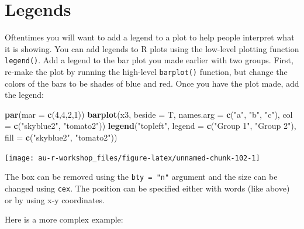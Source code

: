 \documentclass[]{book}
\newenvironment{Shaded}{\begin{snugshade}}{\end{snugshade}}
\newcommand{\DataTypeTok}[1]{\textcolor[rgb]{0.13,0.29,0.53}{#1}}
\newcommand{\DecValTok}[1]{\textcolor[rgb]{0.00,0.00,0.81}{#1}}
\newcommand{\KeywordTok}[1]{\textcolor[rgb]{0.13,0.29,0.53}{\textbf{#1}}}
\newcommand{\NormalTok}[1]{#1}
\newcommand{\StringTok}[1]{\textcolor[rgb]{0.31,0.60,0.02}{#1}}
\begin{document}
\hypertarget{legends}{%
\section{Legends}\label{legends}}

Oftentimes you will want to add a legend to a plot to help people interpret what it is showing. You can add legends to R plots using the low-level plotting function \texttt{legend()}. Add a legend to the bar plot you made earlier with two groups. First, re-make the plot by running the high-level \texttt{barplot()} function, but change the colors of the bars to be shades of blue and red. Once you have the plot made, add the legend:

\begin{Shaded}
\begin{Highlighting}[]
\KeywordTok{par}\NormalTok{(}\DataTypeTok{mar =} \KeywordTok{c}\NormalTok{(}\DecValTok{4}\NormalTok{,}\DecValTok{4}\NormalTok{,}\DecValTok{2}\NormalTok{,}\DecValTok{1}\NormalTok{))}
\KeywordTok{barplot}\NormalTok{(x3, }\DataTypeTok{beside =}\NormalTok{ T, }
        \DataTypeTok{names.arg =} \KeywordTok{c}\NormalTok{(}\StringTok{"a"}\NormalTok{, }\StringTok{"b"}\NormalTok{, }\StringTok{"c"}\NormalTok{),}
        \DataTypeTok{col =} \KeywordTok{c}\NormalTok{(}\StringTok{"skyblue2"}\NormalTok{, }\StringTok{"tomato2"}\NormalTok{))}
\KeywordTok{legend}\NormalTok{(}\StringTok{"topleft"}\NormalTok{, }\DataTypeTok{legend =} \KeywordTok{c}\NormalTok{(}\StringTok{"Group 1"}\NormalTok{, }\StringTok{"Group 2"}\NormalTok{),}
       \DataTypeTok{fill =} \KeywordTok{c}\NormalTok{(}\StringTok{"skyblue2"}\NormalTok{, }\StringTok{"tomato2"}\NormalTok{))}
\end{Highlighting}
\end{Shaded}

\begin{center}\texttt{[image: au-r-workshop\_files/figure-latex/unnamed-chunk-102-1]} \end{center}

The box can be removed using the \texttt{bty\ =\ "n"} argument and the size can be changed using \texttt{cex}. The position can be specified either with words (like above) or by using x-y coordinates.

Here is a more complex example:
\end{document}
